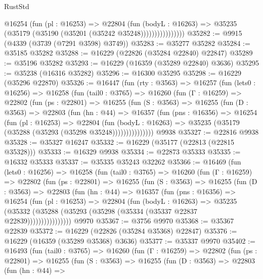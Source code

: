 \begin{lexlean}{RustStd}
\begin{coremodule}
                      @16254
                        (fun (pl : @16253) =>
                        @22804
                          (fun (bodyL : @16263) =>
                          @35235 (@35179 (@35190 (@35201 (@35242 @35248))))))))))))))))
@35282 := @9915 (@4339 (@3739 (@7291 @3598) @3749))
@35283 := @35277 @35282
@35284 := @35185 @35282
@35288 := @16229 (@22826 (@35284 @22840) @22847)
@35289 := @35196 @35282
@35293 := @16229 (@16359 (@35289 @22840) @3636)
@35295 := @35238 (@16316 @35282)
@35296 := @16300 @35295
@35298 := @16229 (@35296 @22870)
@35326 := @16447
    (fun (rty : @3563) =>
    @16257
      (fun (lets0 : @16256) =>
      @16258
        (fun (tail0 : @3765) =>
        @16260
          (fun (Γ : @16259) =>
          @22802
            (fun (ps : @22801) =>
            @16255
              (fun (S : @3563) =>
              @16255
                (fun (D : @3563) =>
                @22803
                  (fun (hn : @44) =>
                  @16357
                    (fun (pns : @16356) =>
                    @16254
                      (fun (pl : @16253) =>
                      @22804
                        (fun (bodyL : @16263) =>
                        @35235 (@35179 (@35288 (@35293 (@35298 @35248)))))))))))))))
    @9938
@35327 := @22816 @9938
@35328 := @35327 @16247
@35332 := @16229 (@35177 (@22813 (@22815 @35328)))
@35333 := @16329 @9938
@35334 := @22873 @35333
@35335 := @16332 @35333
@35337 := @35335 @35243 @32262
@35366 := @16469
    (fun (lets0 : @16256) =>
    @16258
      (fun (tail0 : @3765) =>
      @16260
        (fun (Γ : @16259) =>
        @22802
          (fun (ps : @22801) =>
          @16255
            (fun (S : @3563) =>
            @16255
              (fun (D : @3563) =>
              @22803
                (fun (hn : @44) =>
                @16357
                  (fun (pns : @16356) =>
                  @16254
                    (fun (pl : @16253) =>
                    @22804
                      (fun (bodyL : @16263) =>
                      @35235
                        (@35332
                          (@35288 (@35293 (@35298 (@35334 (@35337 @22837 @22839))))))))))))))))
    @9970
@35367 := @3756 @9970
@35368 := @35367 @22839
@35372 := @16229 (@22826 (@35284 @35368) @22847)
@35376 := @16229 (@16359 (@35289 @35368) @3636)
@35377 := @35337 @9970
@35402 := @16493
    (fun (tail0 : @3765) =>
    @16260
      (fun (Γ : @16259) =>
      @22802
        (fun (ps : @22801) =>
        @16255
          (fun (S : @3563) =>
          @16255
            (fun (D : @3563) =>
            @22803
              (fun (hn : @44) =>

\end{coremodule}
\end{lexlean}
